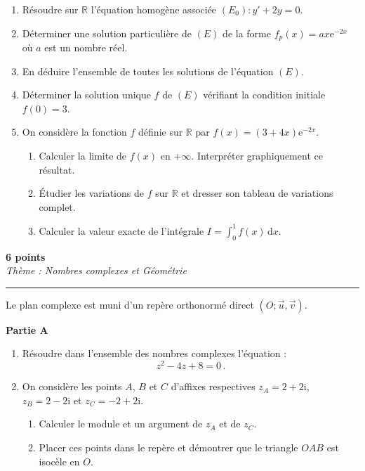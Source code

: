 \documentclass[12pt,a4paper]{article}
\newcommand{\exercice}[3][5]{%
    \noindent{\Large\textbf{Exercice #2}} \hfill \textbf{#1 points}\\[0.20cm]%
    {\normalsize\textit{#3}}%
    \par\vspace{0.28cm}\hrule\vspace{0.55cm}%
}
\newcommand{\partie}[1]{\vspace{0.45cm}\noindent\textbf{\large Partie #1}\par\vspace{0.25cm}}
\begin{document}
\begin{enumerate}
    \item Résoudre sur $\mathbb{R}$ l'équation homogène associée $(E_0) : y' + 2y = 0$.
    
    \vspace{0.55cm}
    \item Déterminer une solution particulière de $(E)$ de la forme $f_p(x) = ax\mathrm{e}^{-2x}$ où $a$ est un nombre réel.
    
    \vspace{0.55cm}
    \item En déduire l'ensemble de toutes les solutions de l'équation $(E)$.
    
    \vspace{0.55cm}
    \item Déterminer la solution unique $f$ de $(E)$ vérifiant la condition initiale $f(0) = 3$.
    
    \vspace{0.55cm}
    \item On considère la fonction $f$ définie sur $\mathbb{R}$ par $f(x) = (3 + 4x)\mathrm{e}^{-2x}$.
    \begin{enumerate}
        \item Calculer la limite de $f(x)$ en $+\infty$. Interpréter graphiquement ce résultat.
        \item Étudier les variations de $f$ sur $\mathbb{R}$ et dresser son tableau de variations complet.
        \item Calculer la valeur exacte de l'intégrale $I = \int_{0}^{1} f(x)\,\mathrm{d}x$.
    \end{enumerate}
\end{enumerate}

\newpage

\exercice[6]{3}{Thème : Nombres complexes et Géométrie}

Le plan complexe est muni d'un repère orthonormé direct $(O; \vec{u}, \vec{v})$.

\vspace{0.45cm}

\partie{A}

\begin{enumerate}
    \item Résoudre dans l'ensemble des nombres complexes l'équation :
    \[
        z^2 - 4z + 8 = 0\,.
    \]
    
    \item On considère les points $A$, $B$ et $C$ d'affixes respectives $z_A = 2 + 2\mathrm{i}$, $z_B = 2 - 2\mathrm{i}$ et $z_C = -2 + 2\mathrm{i}$.
    \begin{enumerate}
        \item Calculer le module et un argument de $z_A$ et de $z_C$.
        \item Placer ces points dans le repère et démontrer que le triangle $OAB$ est isocèle en $O$.
    \end{enumerate}
\end{enumerate}
\end{document}
